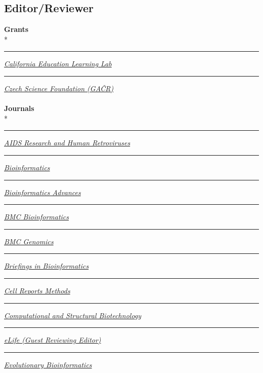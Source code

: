\documentclass[margin,line]{res}
\begin{document}
\begin{resume}
\section{\sc Editor/Reviewer}
\textbf{Grants}\\*
\rule{-1mm}{5mm} \hspace*{4mm} \href{http://opr.ca.gov/learninglab/}{\textit{California Education Learning Lab}}\\
\rule{-1mm}{5mm} \hspace*{4mm} \href{https://gacr.cz/}{\textit{Czech Science Foundation (GA\v{C}R)}}\\
~\\
\textbf{Journals}\\*
\rule{-1mm}{5mm} \hspace*{4mm} \href{https://home.liebertpub.com/publications/aids-research-and-human-retroviruses/2}{\textit{AIDS Research and Human Retroviruses
}}\\
\rule{-1mm}{5mm} \hspace*{4mm} \href{https://academic.oup.com/bioinformatics}{\textit{Bioinformatics}}\\
\rule{-1mm}{5mm} \hspace*{4mm} \href{https://academic.oup.com/bioinformaticsadvances}{\textit{Bioinformatics Advances}}\\
\rule{-1mm}{5mm} \hspace*{4mm} \href{https://bmcbioinformatics.biomedcentral.com/}{\textit{BMC Bioinformatics}}\\
\rule{-1mm}{5mm} \hspace*{4mm} \href{https://bmcgenomics.biomedcentral.com/}{\textit{BMC Genomics}}\\
\rule{-1mm}{5mm} \hspace*{4mm} \href{https://academic.oup.com/bib}{\textit{Briefings in Bioinformatics}}\\
\rule{-1mm}{5mm} \hspace*{4mm} \href{https://www.cell.com/cell-reports-methods}{\textit{Cell Reports Methods}}\\
\rule{-1mm}{5mm} \hspace*{4mm} \href{https://www.sciencedirect.com/journal/computational-and-structural-biotechnology-journal}{\textit{Computational and Structural Biotechnology}}\\
\rule{-1mm}{5mm} \hspace*{4mm} \href{https://elifesciences.org/}{\textit{eLife (Guest Reviewing Editor)}}\\
\rule{-1mm}{5mm} \hspace*{4mm} \href{https://journals.sagepub.com/home/evb}{\textit{Evolutionary Bioinformatics}}\\

\end{resume}
\end{document}
